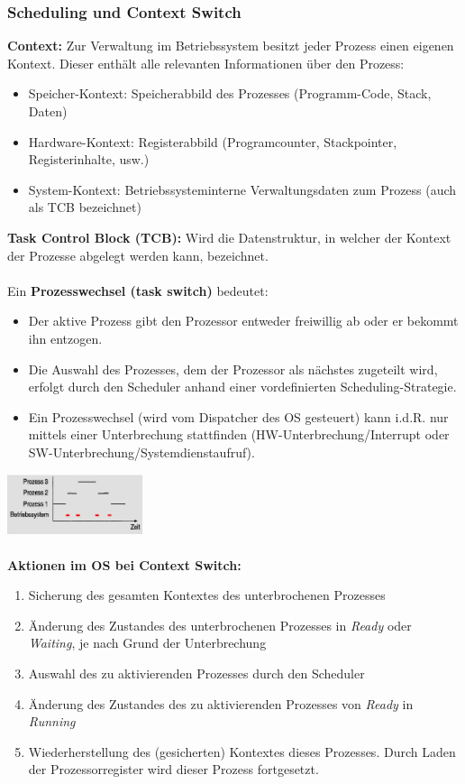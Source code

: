 \subsubsection{Scheduling und Context Switch}
\textbf{Context:} Zur Verwaltung im Betriebssystem besitzt jeder Prozess einen eigenen Kontext. Dieser enthält alle relevanten Informationen über den Prozess: 
\begin{itemize}
    \item Speicher-Kontext: Speicherabbild des Prozesses (Programm-Code, Stack, Daten)
    \item Hardware-Kontext: Registerabbild (Programcounter, Stackpointer, Registerinhalte, usw.)
    \item System-Kontext: Betriebssysteminterne Verwaltungsdaten zum Prozess (auch als TCB bezeichnet)
\end{itemize}
\textbf{Task Control Block (TCB):}
Wird die Datenstruktur, in welcher der Kontext der
Prozesse abgelegt werden kann, bezeichnet.\\\\
Ein \textbf{Prozesswechsel (task switch)} bedeutet:
\begin{itemize}
    \item Der aktive Prozess gibt den Prozessor entweder freiwillig ab oder er bekommt ihn entzogen. 
    \item Die Auswahl des Prozesses, dem der Prozessor als nächstes zugeteilt wird, erfolgt durch den Scheduler anhand einer vordefinierten Scheduling-Strategie.
    \item Ein Prozesswechsel (wird vom Dispatcher des OS gesteuert) kann i.d.R. nur mittels einer Unterbrechung stattfinden (HW-Unterbrechung/Interrupt oder SW-Unterbrechung/Systemdienstaufruf).
\end{itemize}
\includegraphics[width=0.3\textwidth]{images/Betriebssysteme/Prozesswechsel.png} \\\\
\textbf{Aktionen im OS bei Context Switch:}
\begin{enumerate}
    \item Sicherung des gesamten Kontextes des unterbrochenen Prozesses
    \item Änderung des Zustandes des unterbrochenen Prozesses in \textit{Ready} oder \textit{Waiting}, je nach Grund der Unterbrechung
    \item Auswahl des zu aktivierenden Prozesses durch den Scheduler
    \item Änderung des Zustandes des zu aktivierenden Prozesses von \textit{Ready} in \textit{Running}
    \item Wiederherstellung des (gesicherten) Kontextes dieses Prozesses. Durch Laden der Prozessorregister wird dieser Prozess fortgesetzt.
\end{enumerate}
